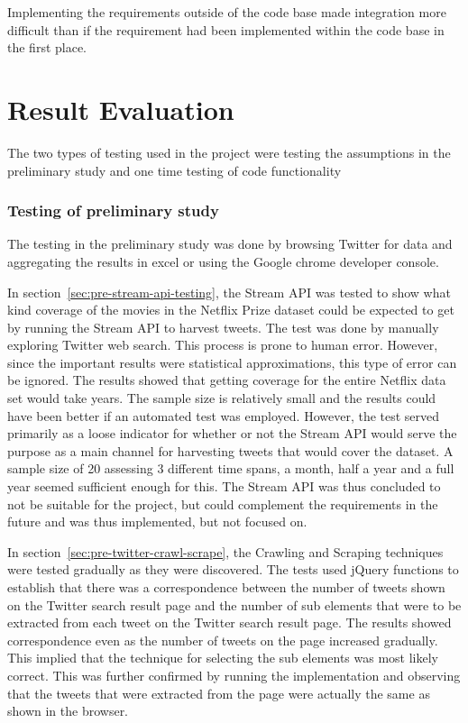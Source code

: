 Implementing the requirements outside of the code base made integration more difficult than if the requirement had been implemented within the code base in the first place.

\section{Result Evaluation}
The two types of testing used in the project were testing the assumptions in the preliminary study and one time testing of code functionality

\subsubsection{Testing of preliminary study}
The testing in the preliminary study was done by browsing Twitter for data and aggregating the results in excel or using the Google chrome developer console.

In section~\ref{sec:pre-stream-api-testing}, the Stream API was tested to show what kind coverage of the movies in the Netflix Prize dataset could be expected to get by running the Stream API to harvest tweets. The test was done by manually exploring Twitter web search. This process is prone to human error. However, since the important results were statistical approximations, this type of error can be ignored. The results showed that getting coverage for the entire Netflix data set would take years. The sample size is relatively small and the results could have been better if an automated test was employed. However, the test served primarily as a loose indicator for whether or not the Stream API would serve the purpose as a main channel for harvesting tweets that would cover the dataset. A sample size of 20 assessing 3 different time spans, a month, half a year and a full year seemed sufficient enough for this. The Stream API was thus concluded to not be suitable for the project, but could complement the requirements in the future and was thus implemented, but not focused on.

In section~\ref{sec:pre-twitter-crawl-scrape}, the Crawling and Scraping techniques were tested gradually as they were discovered. The tests used jQuery functions to establish that there was a correspondence between the number of tweets shown on the Twitter search result page and the number of sub elements that were to be extracted from each tweet on the Twitter search result page. The results showed correspondence even as the number of tweets on the page increased gradually. This implied that the technique for selecting the sub elements was most likely correct. This was further confirmed by running the implementation and observing that the tweets that were extracted from the page were actually the same as shown in the browser.

